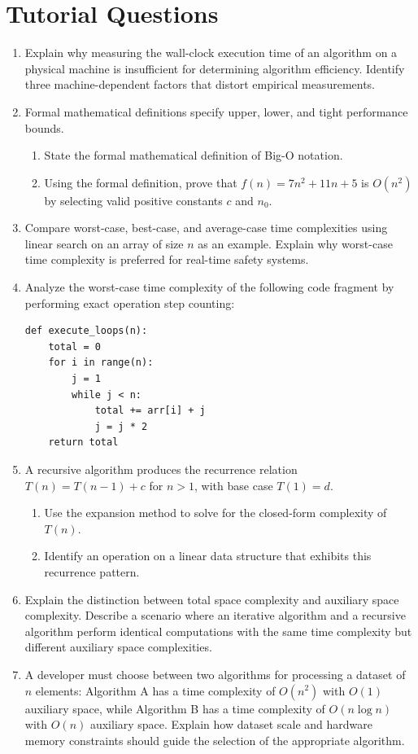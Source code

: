 \documentclass[12pt]{report}
\begin{document}
\section*{Tutorial Questions}

\begin{enumerate}
    \item Explain why measuring the wall-clock execution time of an algorithm on a physical machine is insufficient for determining algorithm efficiency. Identify three machine-dependent factors that distort empirical measurements.
    \item Formal mathematical definitions specify upper, lower, and tight performance bounds.
    \begin{enumerate}
        \item State the formal mathematical definition of Big-O notation.
        \item Using the formal definition, prove that $f(n) = 7n^2 + 11n + 5$ is $O(n^2)$ by selecting valid positive constants $c$ and $n_0$.
    \end{enumerate}
    \item Compare worst-case, best-case, and average-case time complexities using linear search on an array of size $n$ as an example. Explain why worst-case time complexity is preferred for real-time safety systems.
    \item Analyze the worst-case time complexity of the following code fragment by performing exact operation step counting:
\begin{verbatim}
def execute_loops(n):
    total = 0
    for i in range(n):
        j = 1
        while j < n:
            total += arr[i] + j
            j = j * 2
    return total
\end{verbatim}
    \item A recursive algorithm produces the recurrence relation $T(n) = T(n - 1) + c$ for $n > 1$, with base case $T(1) = d$. 
    \begin{enumerate}
        \item Use the expansion method to solve for the closed-form complexity of $T(n)$.
        \item Identify an operation on a linear data structure that exhibits this recurrence pattern.
    \end{enumerate}
    \item Explain the distinction between total space complexity and auxiliary space complexity. Describe a scenario where an iterative algorithm and a recursive algorithm perform identical computations with the same time complexity but different auxiliary space complexities.
    \item A developer must choose between two algorithms for processing a dataset of $n$ elements: Algorithm A has a time complexity of $O(n^2)$ with $O(1)$ auxiliary space, while Algorithm B has a time complexity of $O(n \log n)$ with $O(n)$ auxiliary space. Explain how dataset scale and hardware memory constraints should guide the selection of the appropriate algorithm.
\end{enumerate}
\end{document}
